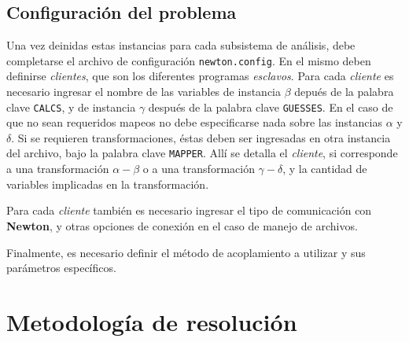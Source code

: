 \subsection*{Configuración del problema}
\label{ap1:abgd}

Una vez deinidas estas instancias para cada subsistema de análisis, debe completarse el archivo de configuración \texttt{newton.config}.
En el mismo deben definirse \textit{clientes}, que son los diferentes programas \textit{esclavos}.
Para cada \textit{cliente} es necesario ingresar el nombre de las variables de instancia $\beta$ depués de la palabra clave \texttt{CALCS},
y de instancia $\gamma$ después de la palabra clave \texttt{GUESSES}.
En el caso de que no sean requeridos mapeos no debe especificarse nada sobre las instancias $\alpha$ y $\delta$.
Si se requieren transformaciones, éstas deben ser ingresadas en otra instancia del archivo, bajo la palabra clave \texttt{MAPPER}.
Allí se detalla el \textit{cliente}, si corresponde a una transformación $\alpha-\beta$ o a una transformación $\gamma-\delta$, y la cantidad de variables implicadas en la transformación.

Para cada \textit{cliente} también es necesario ingresar el tipo de comunicación con \textbf{Newton}, y otras opciones de conexión en el caso de manejo de archivos.

Finalmente, es necesario definir el método de acoplamiento a utilizar y sus parámetros específicos.

\section{Metodología de resolución}
\label{ap2:metodologia-newton}


